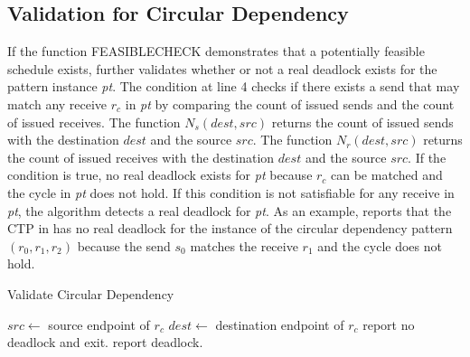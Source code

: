 \subsection{Validation for Circular Dependency}


If the function \textrm{FEASIBLECHECK} demonstrates that a potentially feasible schedule exists,  further validates whether or not a real deadlock exists for the pattern instance \textit{pt}. The condition at line 4 checks if there exists a send that may match any receive $\mathit{r_c}$ in \textit{pt} by comparing the count of issued sends and the count of issued receives.    
The function $\mathit{N_s}(\mathit{dest},\mathit{src})$ returns the count of issued sends with the destination $\mathit{dest}$ and the source $\mathit{src}$. The function $\mathit{N_r}(\mathit{dest},\mathit{src})$ returns the count of issued receives with the destination $\mathit{dest}$ and the source $\mathit{src}$.
If the condition is true, no real deadlock exists for \textit{pt} because $\mathit{r_c}$ can be matched and the cycle in \textit{pt} does not hold. If this condition is not satisfiable for any receive in \textit{pt}, the algorithm detects a real deadlock for \textit{pt}.
As an example,  reports that the CTP in  has no real deadlock for the instance of the circular dependency pattern $(r_0,r_1,r_2)$ because the send $s_0$ matches the receive $r_1$ and the cycle does not hold.

\begin{algorithm}
\caption{Validate Circular Dependency}\label{algo:vcircular}
\begin{algorithmic}[1]
\State $\mathit{src} \gets$ source endpoint of $\mathit{r_c}$ 
\State $\mathit{dest} \gets$ destination endpoint of $\mathit{r_c}$
\State report no deadlock and exit.
\EndIf
\EndFor
\State report deadlock.
\end{algorithmic}
\end{algorithm}


